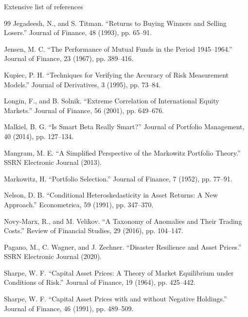 \documentclass[aspectratio=169,10pt]{beamer}
\begin{document}
\begin{frame}{Extensive list of references}
\begin{thebibliography}{99}
 Jegadeesh, N., and S. Titman. “Returns to Buying Winners and Selling Losers.” Journal of Finance, 48 (1993), pp. 65–91.

 Jensen, M. C. “The Performance of Mutual Funds in the Period 1945–1964.” Journal of Finance, 23 (1967), pp. 389–416.

 Kupiec, P. H. “Techniques for Verifying the Accuracy of Risk Measurement Models.” Journal of Derivatives, 3 (1995), pp. 73–84.

 Longin, F., and B. Solnik. “Extreme Correlation of International Equity Markets.” Journal of Finance, 56 (2001), pp. 649–676.

 Malkiel, B. G. “Is Smart Beta Really Smart?” Journal of Portfolio Management, 40 (2014), pp. 127–134.

 Mangram, M. E. “A Simplified Perspective of the Markowitz Portfolio Theory.” SSRN Electronic Journal (2013).

 Markowitz, H. “Portfolio Selection.” Journal of Finance, 7 (1952), pp. 77–91.

 Nelson, D. B. “Conditional Heteroskedasticity in Asset Returns: A New Approach.” Econometrica, 59 (1991), pp. 347–370.

 Novy-Marx, R., and M. Velikov. “A Taxonomy of Anomalies and Their Trading Costs.” Review of Financial Studies, 29 (2016), pp. 104–147.

 Pagano, M., C. Wagner, and J. Zechner. “Disaster Resilience and Asset Prices.” SSRN Electronic Journal (2020).

 Sharpe, W. F. “Capital Asset Prices: A Theory of Market Equilibrium under Conditions of Risk.” Journal of Finance, 19 (1964), pp. 425–442.

 Sharpe, W. F. “Capital Asset Prices with and without Negative Holdings.” Journal of Finance, 46 (1991), pp. 489–509.

\end{thebibliography}
\end{frame}
\end{document}
